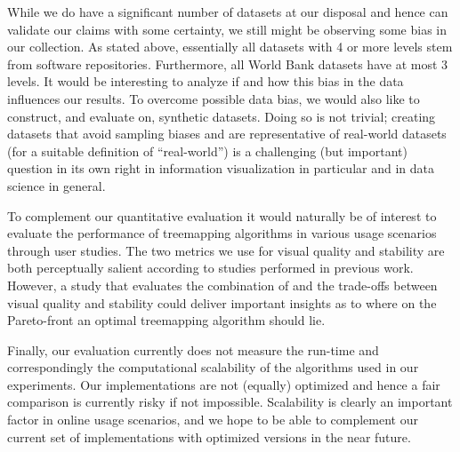 While we do have a significant number of datasets at our disposal and hence can validate our claims with some certainty, we still might be observing some bias in our collection. As stated above, essentially all datasets with 4 or more levels stem from software repositories. Furthermore, all World Bank datasets have at most 3 levels. It would be interesting to analyze if and how this bias in the data influences our results.
To overcome possible data bias, we would also like to construct, and evaluate on, synthetic datasets. Doing so is not trivial; creating datasets that avoid sampling biases and are representative of real-world datasets (for a suitable definition of ``real-world'') is a challenging (but important) question in its own right in information visualization in particular and in data science in general.

To complement our quantitative evaluation it would naturally be of interest to evaluate the performance of treemapping algorithms in various usage scenarios through user studies. The two metrics we use for visual quality and stability are both perceptually salient according to studies performed in previous work. However, a study that evaluates the combination of and the trade-offs between visual quality and stability could deliver important insights as to where on the Pareto-front an optimal treemapping algorithm should lie.

Finally, our evaluation currently does not measure the run-time and correspondingly the computational scalability of the algorithms used in our experiments. Our implementations are not (equally) optimized and hence a fair comparison is currently risky if not impossible. Scalability is clearly an important factor in online usage scenarios, and we hope to be able to complement our current set of implementations with optimized versions in the near future.

